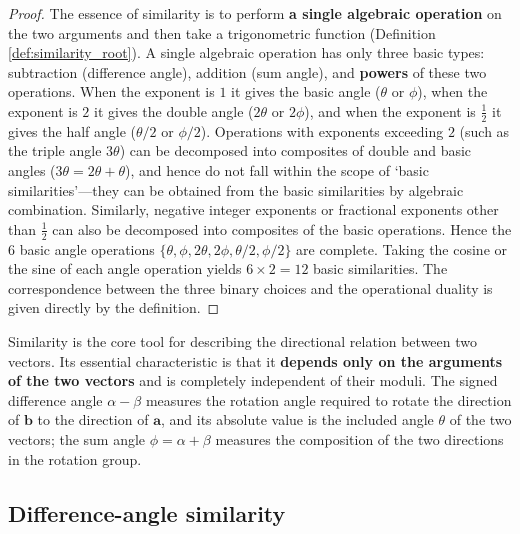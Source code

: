 \begin{proof}
The essence of similarity is to perform \textbf{a single algebraic operation} on the two arguments and then take a trigonometric function (Definition \ref{def:similarity_root}). A single algebraic operation has only three basic types: subtraction (difference angle), addition (sum angle), and \textbf{powers} of these two operations. When the exponent is $1$ it gives the basic angle ($\theta$ or $\phi$), when the exponent is $2$ it gives the double angle ($2\theta$ or $2\phi$), and when the exponent is $\frac{1}{2}$ it gives the half angle ($\theta/2$ or $\phi/2$). Operations with exponents exceeding $2$ (such as the triple angle $3\theta$) can be decomposed into composites of double and basic angles ($3\theta = 2\theta + \theta$), and hence do not fall within the scope of `basic similarities'---they can be obtained from the basic similarities by algebraic combination. Similarly, negative integer exponents or fractional exponents other than $\frac{1}{2}$ can also be decomposed into composites of the basic operations. Hence the $6$ basic angle operations $\{\theta, \phi, 2\theta, 2\phi, \theta/2, \phi/2\}$ are complete. Taking the cosine or the sine of each angle operation yields $6 \times 2 = 12$ basic similarities. The correspondence between the three binary choices and the operational duality is given directly by the definition.
\end{proof}

\begin{definition}\label{def:similarity_essence}
Similarity is the core tool for describing the directional relation between two vectors. Its essential characteristic is that it \textbf{depends only on the arguments of the two vectors} and is completely independent of their moduli. The signed difference angle $\alpha - \beta$ measures the rotation angle required to rotate the direction of $\mathbf{b}$ to the direction of $\mathbf{a}$, and its absolute value is the included angle $\theta$ of the two vectors; the sum angle $\phi = \alpha + \beta$ measures the composition of the two directions in the rotation group.
\end{definition}

\subsection{\texorpdfstring{Difference-angle similarity}{Difference-angle similarity}}


